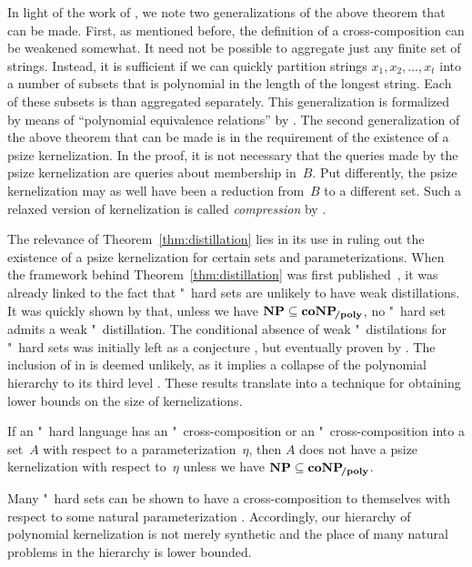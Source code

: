 In light of the work of \textcite{bodlaender2014kernelization}, we note two generalizations of the above theorem that can be made.
First, as mentioned before, the definition of a cross-composition can be weakened somewhat.
It need not be possible to aggregate just any finite set of strings.
Instead, it is sufficient if we can quickly partition strings $x_1, x_2, \ldots, x_t$ into a number of subsets that is polynomial in the length of the longest string.
Each of these subsets is than aggregated separately.
This generalization is formalized by means of \enquote{polynomial equivalence relations} by \textcite{bodlaender2014kernelization}.
The second generalization of the above theorem that can be made is in the requirement of the existence of a psize kernelization.
In the proof, it is not necessary that the queries made by the psize kernelization are queries about membership in~$B$.
Put differently, the psize kernelization may as well have been a reduction from~$B$ to a different set.
Such a relaxed version of kernelization is called \emph{compression} by \textcite{bodlaender2014kernelization}.

The relevance of Theorem~\ref{thm:distillation} lies in its use in ruling out the existence of a psize kernelization for certain sets and parameterizations.
When the framework behind Theorem~\ref{thm:distillation} was first published~\parencite{bodlaender2009problems}, it was already linked to the fact that "~hard sets are unlikely to have weak distillations.
It was quickly shown by \textcite{fortnow2011infeasibility} that, unless we have $\textnormal{\textbf{NP}} \subseteq \textnormal{\textbf{coNP}}\!_\textnormal{\textbf{/poly}}$, no "~hard set admits a weak "~distillation.
The conditional absence of weak "~distilations for "~hard sets was initially left as a conjecture \parencite{bodlaender2009problems}, but eventually proven by \textcite{drucker2015new}.
The inclusion of  in  is deemed unlikely, as it implies a collapse of the polynomial hierarchy to its third level \parencite{yap1983some}.
These results translate into a technique for obtaining lower bounds on the size of kernelizations.
\begin{corollary}
  If an "~hard language has an "~cross-composition or an "~cross-composition into a set~$A$ with respect to a parameterization~$\eta$, then $A$ does not have a psize kernelization with respect to~$\eta$ unless we have $\textnormal{\textbf{NP}} \subseteq \textnormal{\textbf{coNP}}\!_\textnormal{\textbf{/poly}}$.
\end{corollary}

Many "~hard sets can be shown to have a cross-composition to themselves with respect to some natural parameterization \parencite{bodlaender2014kernelization,fomin2019kernelization}.
Accordingly, our hierarchy of polynomial kernelization is not merely synthetic and the place of many natural problems in the hierarchy is lower bounded.

